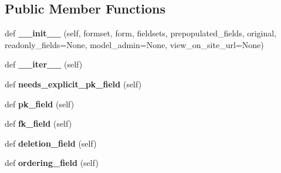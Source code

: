 \subsection*{Public Member Functions}
\begin{DoxyCompactItemize}
\item 
\mbox{\label{classdjango_1_1contrib_1_1admin_1_1helpers_1_1_inline_admin_form_a363149216e820defb1495c45158d00ce}} 
def {\bfseries \+\_\+\+\_\+init\+\_\+\+\_\+} (self, formset, form, fieldsets, prepopulated\+\_\+fields, original, readonly\+\_\+fields=None, model\+\_\+admin=None, view\+\_\+on\+\_\+site\+\_\+url=None)
\item 
\mbox{\label{classdjango_1_1contrib_1_1admin_1_1helpers_1_1_inline_admin_form_aace2ad422fec88394a0e814c672a1a05}} 
def {\bfseries \+\_\+\+\_\+iter\+\_\+\+\_\+} (self)
\item 
\mbox{\label{classdjango_1_1contrib_1_1admin_1_1helpers_1_1_inline_admin_form_aed734c99e5572faf5b56aa01ac843969}} 
def {\bfseries needs\+\_\+explicit\+\_\+pk\+\_\+field} (self)
\item 
\mbox{\label{classdjango_1_1contrib_1_1admin_1_1helpers_1_1_inline_admin_form_af7ee4897937351734dfd6161994272d2}} 
def {\bfseries pk\+\_\+field} (self)
\item 
\mbox{\label{classdjango_1_1contrib_1_1admin_1_1helpers_1_1_inline_admin_form_a9bcb09684b1b45cf30d4dfd91488f227}} 
def {\bfseries fk\+\_\+field} (self)
\item 
\mbox{\label{classdjango_1_1contrib_1_1admin_1_1helpers_1_1_inline_admin_form_a5af66a0e9e812154890ee48bfd4ab3e1}} 
def {\bfseries deletion\+\_\+field} (self)
\item 
\mbox{\label{classdjango_1_1contrib_1_1admin_1_1helpers_1_1_inline_admin_form_a33c0faaafac213c8fb7def00efcaf86f}} 
def {\bfseries ordering\+\_\+field} (self)
\end{DoxyCompactItemize}
